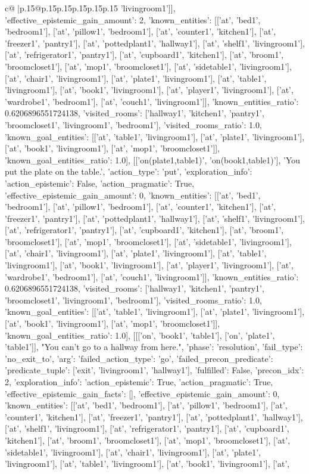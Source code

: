 \documentclass{article}
\begin{document}
{\begin{supertabular}{c@{$\;$}|p{.15\linewidth}@{}p{.15\linewidth}p{.15\linewidth}p{.15\linewidth}p{.15\linewidth}p{.15\linewidth}}
{{{'livingroom1']], 'effective_epistemic_gain_amount': 2, 'known_entities': [['at', 'bed1', 'bedroom1'], ['at', 'pillow1', 'bedroom1'], ['at', 'counter1', 'kitchen1'], ['at', 'freezer1', 'pantry1'], ['at', 'pottedplant1', 'hallway1'], ['at', 'shelf1', 'livingroom1'], ['at', 'refrigerator1', 'pantry1'], ['at', 'cupboard1', 'kitchen1'], ['at', 'broom1', 'broomcloset1'], ['at', 'mop1', 'broomcloset1'], ['at', 'sidetable1', 'livingroom1'], ['at', 'chair1', 'livingroom1'], ['at', 'plate1', 'livingroom1'], ['at', 'table1', 'livingroom1'], ['at', 'book1', 'livingroom1'], ['at', 'player1', 'livingroom1'], ['at', 'wardrobe1', 'bedroom1'], ['at', 'couch1', 'livingroom1']], 'known_entities_ratio': 0.6206896551724138, 'visited_rooms': ['hallway1', 'kitchen1', 'pantry1', 'broomcloset1', 'livingroom1', 'bedroom1'], 'visited_rooms_ratio': 1.0, 'known_goal_entities': [['at', 'table1', 'livingroom1'], ['at', 'plate1', 'livingroom1'], ['at', 'book1', 'livingroom1'], ['at', 'mop1', 'broomcloset1']], 'known_goal_entities_ratio': 1.0}}], [['on(plate1,table1)', 'on(book1,table1)'], 'You put the plate on the table.', {'action_type': 'put', 'exploration_info': {'action_epistemic': False, 'action_pragmatic': True, 'effective_epistemic_gain_amount': 0, 'known_entities': [['at', 'bed1', 'bedroom1'], ['at', 'pillow1', 'bedroom1'], ['at', 'counter1', 'kitchen1'], ['at', 'freezer1', 'pantry1'], ['at', 'pottedplant1', 'hallway1'], ['at', 'shelf1', 'livingroom1'], ['at', 'refrigerator1', 'pantry1'], ['at', 'cupboard1', 'kitchen1'], ['at', 'broom1', 'broomcloset1'], ['at', 'mop1', 'broomcloset1'], ['at', 'sidetable1', 'livingroom1'], ['at', 'chair1', 'livingroom1'], ['at', 'plate1', 'livingroom1'], ['at', 'table1', 'livingroom1'], ['at', 'book1', 'livingroom1'], ['at', 'player1', 'livingroom1'], ['at', 'wardrobe1', 'bedroom1'], ['at', 'couch1', 'livingroom1']], 'known_entities_ratio': 0.6206896551724138, 'visited_rooms': ['hallway1', 'kitchen1', 'pantry1', 'broomcloset1', 'livingroom1', 'bedroom1'], 'visited_rooms_ratio': 1.0, 'known_goal_entities': [['at', 'table1', 'livingroom1'], ['at', 'plate1', 'livingroom1'], ['at', 'book1', 'livingroom1'], ['at', 'mop1', 'broomcloset1']], 'known_goal_entities_ratio': 1.0}}], [[['on', 'book1', 'table1'], ['on', 'plate1', 'table1']], "You can't go to a hallway from here.", {'phase': 'resolution', 'fail_type': 'no_exit_to', 'arg': {'failed_action_type': 'go', 'failed_precon_predicate': {'predicate_tuple': ['exit', 'livingroom1', 'hallway1'], 'fulfilled': False, 'precon_idx': 2}}, 'exploration_info': {'action_epistemic': True, 'action_pragmatic': True, 'effective_epistemic_gain_facts': [], 'effective_epistemic_gain_amount': 0, 'known_entities': [['at', 'bed1', 'bedroom1'], ['at', 'pillow1', 'bedroom1'], ['at', 'counter1', 'kitchen1'], ['at', 'freezer1', 'pantry1'], ['at', 'pottedplant1', 'hallway1'], ['at', 'shelf1', 'livingroom1'], ['at', 'refrigerator1', 'pantry1'], ['at', 'cupboard1', 'kitchen1'], ['at', 'broom1', 'broomcloset1'], ['at', 'mop1', 'broomcloset1'], ['at', 'sidetable1', 'livingroom1'], ['at', 'chair1', 'livingroom1'], ['at', 'plate1', 'livingroom1'], ['at', 'table1', 'livingroom1'], ['at', 'book1', 'livingroom1'], ['at', }}}
\end{supertabular}}
\end{document}

